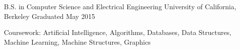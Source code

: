 \begin{cventries}
  \cventry
    {B.S. in Computer Science and Electrical Engineering}
    {University of California, Berkeley}
    {} %
    {Graduated May 2015}
    {
      \begin{cvitems}
        \item {Coursework: Artificial Intelligence, Algorithms, Databases, Data Structures, Machine Learning, Machine Structures, Graphics}
      \end{cvitems}
    }
\end{cventries}
